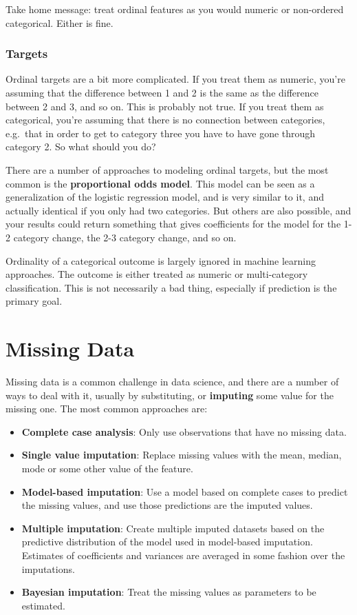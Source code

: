 \documentclass[
  letterpaper,
]{krantz}
\providecommand{\tightlist}{%
  \setlength{\itemsep}{0pt}\setlength{\parskip}{0pt}}\usepackage{longtable,booktabs,array}
\begin{document}
Take home message: treat ordinal features as you would numeric or
non-ordered categorical. Either is fine.

\subsubsection{Targets}\label{targets}

Ordinal targets are a bit more complicated. If you treat them as
numeric, you're assuming that the difference between 1 and 2 is the same
as the difference between 2 and 3, and so on. This is probably not true.
If you treat them as categorical, you're assuming that there is no
connection between categories, e.g.~that in order to get to category
three you have to have gone through category 2. So what should you do?

There are a number of approaches to modeling ordinal targets, but the
most common is the \textbf{proportional odds model}. This model can be
seen as a generalization of the logistic regression model, and is very
similar to it, and actually identical if you only had two categories.
But others are also possible, and your results could return something
that gives coefficients for the model for the 1-2 category change, the
2-3 category change, and so on.

Ordinality of a categorical outcome is largely ignored in machine
learning approaches. The outcome is either treated as numeric or
multi-category classification. This is not necessarily a bad thing,
especially if prediction is the primary goal.

\section{Missing Data}\label{missing-data}

Missing data is a common challenge in data science, and there are a
number of ways to deal with it, usually by substituting, or
\textbf{imputing} some value for the missing one. The most common
approaches are:

\begin{itemize}
\tightlist
\item
  \textbf{Complete case analysis}: Only use observations that have no
  missing data.
\item
  \textbf{Single value imputation}: Replace missing values with the
  mean, median, mode or some other value of the feature.
\item
  \textbf{Model-based imputation}: Use a model based on complete cases
  to predict the missing values, and use those predictions are the
  imputed values.
\item
  \textbf{Multiple imputation}: Create multiple imputed datasets based
  on the predictive distribution of the model used in model-based
  imputation. Estimates of coefficients and variances are averaged in
  some fashion over the imputations.
\item
  \textbf{Bayesian imputation}: Treat the missing values as parameters
  to be estimated.
\end{itemize}
\end{document}
